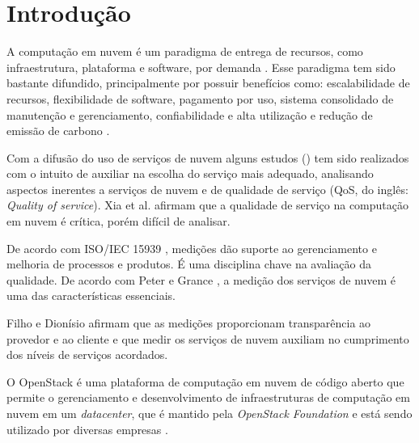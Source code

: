 \documentclass[conference]{IEEEtran}
\begin{document}




%
\IEEEpeerreviewmaketitle



\section{Introdução}
A computação em nuvem é um paradigma de entrega de recursos, como infraestrutura, plataforma e software,
por demanda \cite{garg2011}. Esse paradigma tem sido bastante difundido, principalmente por possuir benefícios como: escalabilidade de recursos, flexibilidade de software, pagamento por uso, sistema consolidado de manutenção e gerenciamento, confiabilidade e alta utilização e redução de 
emissão de carbono \cite{rehman2011teaching}.

Com a difusão do uso de serviços de nuvem alguns estudos (\cite{soltani2016, garg2011, li2012, 
bardsiri2014, lesun2016, quarati2016}) tem sido realizados com o intuito de auxiliar na 
escolha do serviço mais adequado, analisando aspectos inerentes a serviços de nuvem e de qualidade de serviço 
(QoS, do inglês: \textit{Quality of service}). Xia et al. \cite{xia2013} afirmam que a qualidade de serviço na computação
em nuvem é crítica, porém difícil de analisar.  

De acordo com ISO/IEC 15939 \cite{iso15939}, medições dão suporte ao gerenciamento e melhoria de processos e produtos. É uma disciplina
chave na avaliação da qualidade. De acordo com Peter e Grance \cite{mell2011nist}, a medição dos serviços de nuvem é 
uma das características essenciais. 

Filho e Dionísio \cite{leite2016influencia} afirmam que as medições proporcionam
transparência ao provedor e ao cliente e que medir os serviços de nuvem auxiliam no 
cumprimento dos níveis de serviços acordados.

O OpenStack \cite{openstack_general} é uma plataforma de computação em nuvem de código aberto que permite o gerenciamento e desenvolvimento 
de infraestruturas de computação em nuvem em um \textit{datacenter}, que é mantido pela 
\textit{OpenStack Foundation} e está sendo utilizado por diversas empresas \cite{openstack} \cite{bui2016}.
\end{document}
